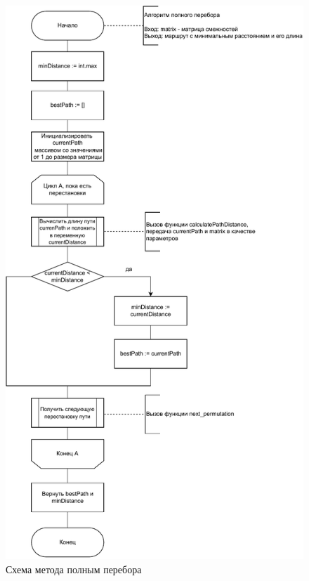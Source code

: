\begin{figure}[h]
	\centering
	\includegraphics[width=0.8\linewidth]{img/bruteforce.pdf}
	\caption{Схема метода полным перебора}
	\label{img:bruteforce}
\end{figure}

